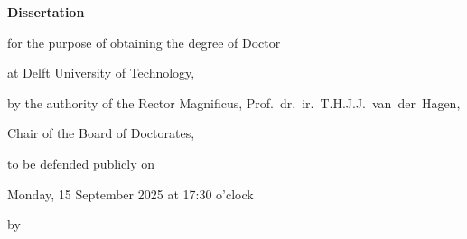 \begin{titlepage}

\begin{center}
\vspace*{2\bigskipamount}

{\makeatletter
\titlestyle\bfseries\LARGE\@title
\makeatother}

{\makeatletter
\ifx\@subtitle\undefined\else
    \bigskip
    \titlefont\titleshape\Large\@subtitle
\fi
\makeatother}
\end{center}

\cleardoublepage
\thispagestyle{empty}

\begin{center}


\vspace*{2\bigskipamount}

{\makeatletter
\titlestyle\bfseries\LARGE\@title
\makeatother}

{\makeatletter
\ifx\@subtitle\undefined\else
    \bigskip
    \titlefont\titleshape\Large\@subtitle
\fi
\makeatother}

\vfill


{\Large\titlefont\bfseries Dissertation}

\bigskip
\bigskip

for the purpose of obtaining the degree of Doctor

at Delft University of Technology,

by the authority of the Rector Magnificus, Prof.~dr.~ir.~T.H.J.J.~van~der~Hagen,

Chair of the Board of Doctorates,

to be defended publicly on

Monday, 15 September 2025 at 17:30 o’clock

\bigskip
\bigskip

by

\bigskip
\bigskip

\makeatletter
{\Large\titlefont\bfseries\@firstname\ \titleshape{\MakeUppercase{\@lastname}}}
\makeatother


\end{center}
\end{titlepage}
